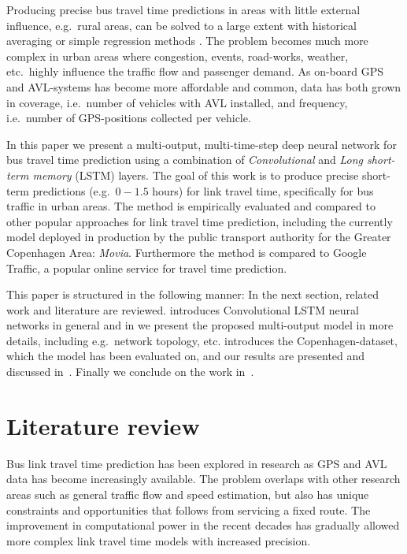 \documentclass[preprint,11pt,5p,twocolumn]{elsarticle}
\begin{document}
Producing precise bus travel time predictions in areas with little external influence, e.g.\ rural areas, can be solved to a large extent with historical averaging or simple regression methods \cite{Williams2003,Altinkaya2013}. The problem becomes much more complex in urban areas where congestion, events, road-works, weather, etc.\ highly influence the traffic flow and passenger demand. As on-board GPS and AVL-systems has become more affordable and common, data has both grown in coverage, i.e.\ number of vehicles with AVL installed, and frequency, i.e.\ number of GPS-positions collected per vehicle.

In this paper we present a multi-output, multi-time-step deep neural network for bus travel time prediction using a combination of \emph{Convolutional} and \emph{Long short-term memory} (LSTM) \cite{Lstm1,Lstm2} layers. The goal of this work is to produce precise short-term predictions (e.g.\ $0-1.5$ hours) for link travel time, specifically for bus traffic in urban areas. The method is empirically evaluated and compared to other popular approaches for link travel time prediction, including the currently model deployed in production by the public transport authority for the Greater Copenhagen Area: \emph{Movia}. Furthermore the method is compared to Google Traffic, a popular online service for travel time prediction. 

This paper is structured in the following manner: In the next section, related work and literature are reviewed.  introduces Convolutional LSTM neural networks in general and in  we present the proposed multi-output model in more details, including e.g.\ network topology, etc.  introduces the Copenhagen-dataset, which the model has been evaluated on, and our results are presented and discussed in~. Finally we conclude on the work in~.

\section{Literature review}
Bus link travel time prediction has been explored in research as GPS and AVL data has become increasingly available. The problem overlaps with other research areas such as general traffic flow and speed estimation, but also has unique constraints and opportunities that follows from servicing a fixed route. The improvement in computational power in the recent decades has gradually allowed more complex link travel time models with increased precision.
\end{document}
